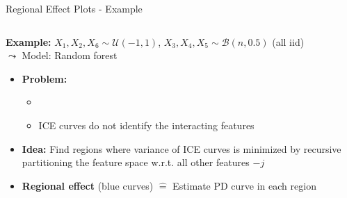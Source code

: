 \documentclass[11pt,compress,t,notes=noshow, aspectratio=169, xcolor=table]{beamer}
\begin{document}
\begin{frame}{Regional Effect Plots - Example}

   

\begin{columns}[T, totalwidth = \linewidth]
    \begin{column}{0.42\textwidth}


\textbf{Example:}
$X_1, X_2, X_6 \sim \mathcal{U}(-1,1)$, 
$X_3, X_4, X_5 \sim \mathcal{B}(n, 0.5)$ (all iid)\\


$\leadsto$ Model: Random forest

        \begin{itemize}
\item \textbf{Problem:} 
\begin{itemize}
    \item {}
    \item ICE curves do not identify the interacting features
\end{itemize}

\item<2-> \textbf{Idea:} Find regions where variance of ICE curves is minimized by recursive partitioning the feature space w.r.t. all other features $-j$\\
\item<3-> {\color{rep}\textbf{Regional effect}} (blue curves)   $\hat = $ Estimate PD curve in each region


\end{itemize}
\end{column}
\end{columns}
\end{frame}
\end{document}
